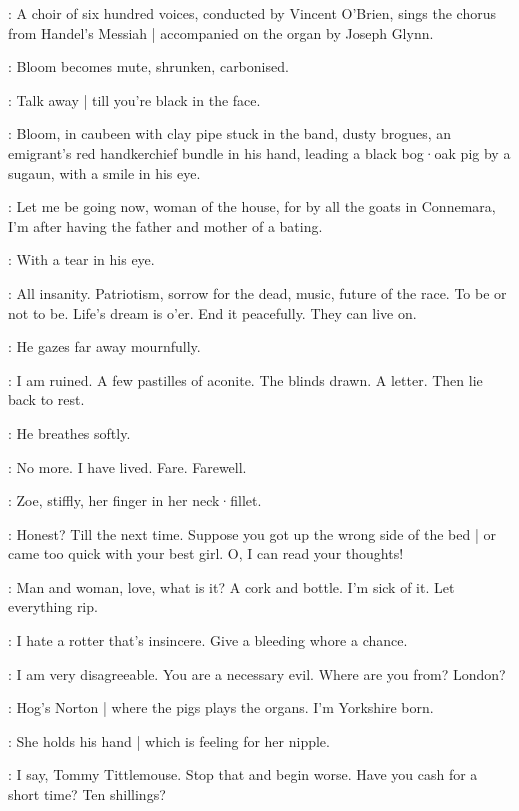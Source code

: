 :
A choir of six hundred voices,
conducted by Vincent O'Brien,
sings the chorus from Handel's Messiah |
accompanied on the organ by Joseph Glynn.

:
Bloom becomes mute,
shrunken,
carbonised.

\par

\Zoe[2]:
Talk away |
till you're black in the face.

:
Bloom,
in caubeen with clay pipe stuck in the band,
dusty brogues,
an emigrant's red handkerchief bundle in his hand,
leading a black bog·oak pig by a sugaun,
with a smile in his eye.

\Bloom:
Let me be going now,
woman of the house,
for by all the goats in Connemara,
I'm after having the father and mother of a bating.

:
With a tear in his eye.

\Bloom:
All insanity.
Patriotism,
sorrow for the dead,
music,
future of the race.
To be or not to be.
Life's dream is o'er.
End it peacefully.
They can live on.

:
He gazes far away mournfully.

\Bloom:
I am ruined.
A few pastilles of aconite.
The blinds drawn.
A letter.
Then lie back to rest.

:
He breathes softly.

\Bloom:
No more.
I have lived.
Fare.
Farewell.

:
Zoe,
stiffly,
her finger in her neck·fillet.

\Zoe:
Honest?
Till the next time.
Suppose you got up the wrong side of the bed |
or came too quick with your best girl.
O,
I can read your thoughts!

\Bloom:
Man and woman,
love,
what is it?
A cork and bottle.
I'm sick of it.
Let everything rip.

\Zoe:
I hate a rotter that's insincere.
Give a bleeding whore a chance.

\Bloom:
I am very disagreeable.
You are a necessary evil.
Where are you from?
London?

\Zoe:
Hog's Norton |
where the pigs plays the organs.
I'm Yorkshire born.

:
She holds his hand |
which is feeling for her nipple.

\Zoe:
I say,
Tommy Tittlemouse.
Stop that and begin worse.
Have you cash for a short time?
Ten shillings?

